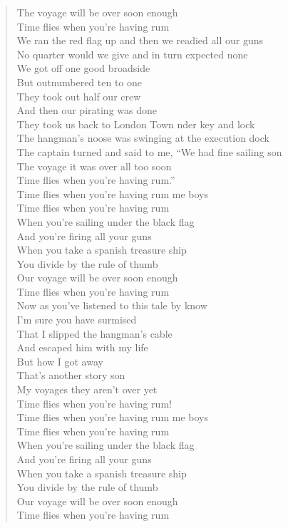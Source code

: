 \documentclass[11pt]{article}
\begin{document}
\begin{verse}
The voyage will be over soon enough\\
Time flies when you're having rum\\
\vspace*{1em}
We ran the red flag up and then we readied all our guns\\
No quarter would we give and in turn expected none\\
We got off one good broadside\\
But outnumbered ten to one\\
They took out half our crew\\
And then our pirating was done\\
They took us back to London Town nder key and lock\\
The hangman's noose was swinging at the execution dock\\
The captain turned and said to me, ``We had fine sailing son\\
The voyage it was over all too soon\\
Time flies when you're having rum.''\\
\vspace*{1em}
Time flies when you're having rum me boys\\
Time flies when you're having rum\\
When you're sailing under the black flag\\
And you're firing all your guns\\
When you take a spanish treasure ship\\
You divide by the rule of thumb\\
Our voyage will be over soon enough\\
Time flies when you're having rum\\
\vspace*{1em}
Now as you've listened to this tale by know\\
I'm sure you have surmised\\
That I slipped the hangman's cable\\
And escaped him with my life\\
But how I got away\\
That's another story son\\
My voyages they aren’t over yet\\
Time flies when you're having rum!\\
\vspace*{1em}
\vspace*{1em}
Time flies when you're having rum me boys\\
Time flies when you're having rum\\
When you're sailing under the black flag\\
And you're firing all your guns\\
When you take a spanish treasure ship\\
You divide by the rule of thumb\\
Our voyage will be over soon enough\\
Time flies when you're having rum\\
\end{verse}
\clearpage
\end{document}

